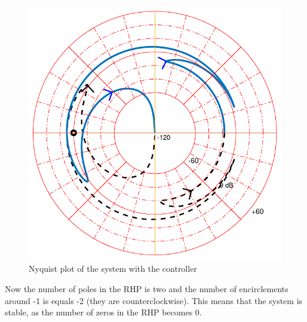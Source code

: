 \begin{figure}[H] 
	\centering 
	\includegraphics[scale=0.46]{figures/nyquistController}	
	\caption{Nyquist plot of the system with the controller}
	\label{nyquistController}
\end{figure}

Now the number of poles in the RHP is two and the number of encirclements around -1 is equals -2 (they are counterclockwise). This means that the system is stable, as the number of zeros in the RHP becomes 0.